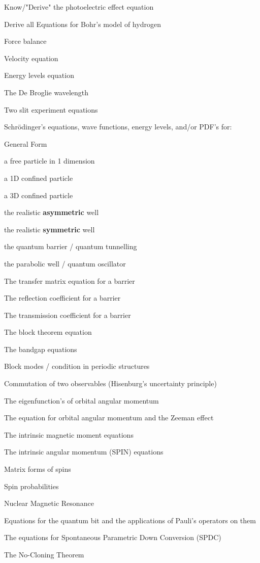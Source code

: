 \documentclass[colorlinks,11pt,a4paper,normalphoto,withhyper,ragged2e]{altareport}
\begin{document}
		\begin{todolist}[leftmargin=1cm]
			\item Know/"Derive" the photoelectric effect equation
			\item Derive all Equations for Bohr's model of hydrogen
			\begin{todolist}[leftmargin=1.5cm]
				\item Force balance
				\item Velocity equation
				\item Energy levels equation
			\end{todolist}
			\item The De Broglie wavelength
			\item Two slit experiment equations
			\item Schrödinger's equations, wave functions, energy levels, and/or PDF's for:
			\begin{todolist}[leftmargin=1.5cm]
				\item General Form
				\item a free particle in 1 dimension
				\item a 1D confined particle
				\item a 3D confined particle
				\item the realistic \textbf{asymmetric} well 
				\item the realistic \textbf{symmetric} well 
				\item the quantum barrier / quantum tunnelling
				\item the parabolic well / quantum oscillator
			\end{todolist}
			\item The transfer matrix equation for a barrier 
			\item The reflection coefficient for a barrier
			\item The transmission coefficient for a barrier
			\item The block theorem equation
			\item The bandgap equations
			\item Block modes / condition in periodic structures
			\item Commutation of two observables (Hisenburg's uncertainty principle)
			\item The eigenfunction's of orbital angular momentum
			\item The equation for orbital angular momentum and the Zeeman effect
			\item The intrinsic magnetic moment equations
			\item The intrinsic angular momentum (SPIN) equations
			\item Matrix forms of spins
			\item Spin probabilities
			\item Nuclear Magnetic Resonance
			\item Equations for the quantum bit and the applications of Pauli's operators on them
			\item The equations for Spontaneous Parametric Down Conversion (SPDC)
			\item The No-Cloning Theorem
		\end{todolist}
		
\end{document}
